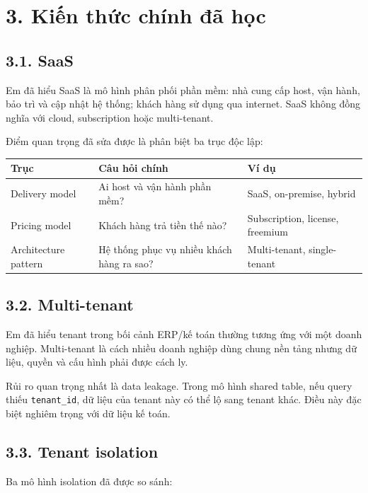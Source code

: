 \documentclass[12pt,a4paper]{article}
\begin{document}
    \section*{3. Kiến thức chính đã học}

    \subsection*{3.1. SaaS}

    Em đã hiểu SaaS là mô hình phân phối phần mềm: nhà cung cấp host, vận hành, bảo trì và cập nhật hệ thống; khách hàng sử dụng qua internet. SaaS không đồng nghĩa với cloud, subscription hoặc multi-tenant.

    Điểm quan trọng đã sửa được là phân biệt ba trục độc lập:

    \begin{longtable}{|p{4cm}|p{5cm}|p{5cm}|}
        \hline
        \textbf{Trục} & \textbf{Câu hỏi chính} & \textbf{Ví dụ} \\
        \hline
        Delivery model & Ai host và vận hành phần mềm? & SaaS, on-premise, hybrid \\
        \hline
        Pricing model & Khách hàng trả tiền thế nào? & Subscription, license, freemium \\
        \hline
        Architecture pattern & Hệ thống phục vụ nhiều khách hàng ra sao? & Multi-tenant, single-tenant \\
        \hline
    \end{longtable}

    \subsection*{3.2. Multi-tenant}

    Em đã hiểu tenant trong bối cảnh ERP/kế toán thường tương ứng với một doanh nghiệp. Multi-tenant là cách nhiều doanh nghiệp dùng chung nền tảng nhưng dữ liệu, quyền và cấu hình phải được cách ly.

    Rủi ro quan trọng nhất là data leakage. Trong mô hình shared table, nếu query thiếu \texttt{tenant\_id}, dữ liệu của tenant này có thể lộ sang tenant khác. Điều này đặc biệt nghiêm trọng với dữ liệu kế toán.

    \subsection*{3.3. Tenant isolation}

    Ba mô hình isolation đã được so sánh:
\end{document}
